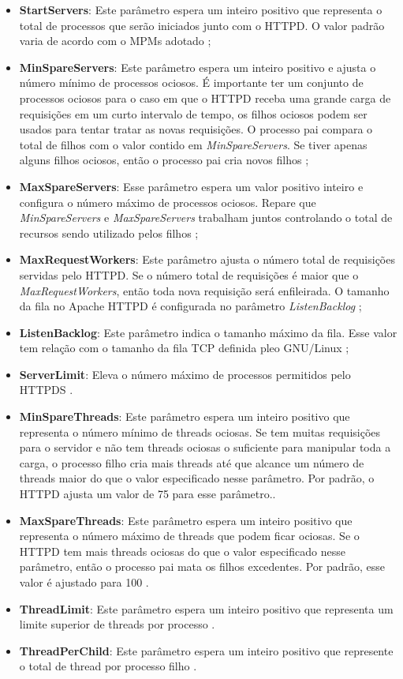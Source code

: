 \begin{itemize} \item \textbf{StartServers}: Este parâmetro espera um inteiro
positivo que representa o total de processos que serão iniciados junto com o
HTTPD.  O valor padrão varia de acordo com o MPMs adotado
\cite{mpm_start_server}; \item \textbf{MinSpareServers}: Este parâmetro espera
um inteiro positivo e ajusta o número mínimo de processos ociosos. É importante
ter um conjunto de processos ociosos para o caso em que o HTTPD receba uma
grande carga de requisições em um curto intervalo de tempo, os filhos ociosos
podem ser usados para tentar tratar as novas requisições. O processo pai
compara o total de filhos com o valor contido em \textit{MinSpareServers}. Se
tiver apenas alguns filhos ociosos, então o processo pai cria novos filhos
\cite{mpm_min_spare}; \item \textbf{MaxSpareServers}: Esse parâmetro espera um
valor positivo inteiro e configura o número máximo de processos ociosos. Repare
que \textit{MinSpareServers} e \textit{MaxSpareServers} trabalham juntos
controlando o total de recursos sendo utilizado pelos filhos
\cite{mpm_max_spare}; \item \textbf{MaxRequestWorkers}: Este parâmetro ajusta o
número total de requisições servidas pelo HTTPD. Se o número total de
requisições é maior que o \textit{MaxRequestWorkers}, então toda nova
requisição será enfileirada. O tamanho da fila no Apache HTTPD é configurada no
parâmetro \textit{ListenBacklog} \cite{mpm_max_request}; \item
\textbf{ListenBacklog}: Este parâmetro indica o tamanho máximo da fila.  Esse
valor tem relação com o tamanho da fila TCP definida pleo GNU/Linux
\cite{mpm_listen}; \item \textbf{ServerLimit}: Eleva o número máximo de
processos permitidos pelo HTTPDS \cite{mpm_server_limit}.  \item
\textbf{MinSpareThreads}: Este parâmetro espera um inteiro positivo que
representa o número mínimo de threads ociosas. Se tem muitas requisições para o
servidor e não tem threads ociosas o suficiente para manipular toda a carga, o
processo filho cria mais threads até que alcance um número de threads maior do
que o valor especificado nesse parâmetro.  Por padrão, o HTTPD ajusta um valor
de 75 para esse parâmetro.\cite{mpm_minsparethreads}.  \item
\textbf{MaxSpareThreads}: Este parâmetro espera um inteiro positivo que
representa o número máximo de threads que podem ficar ociosas. Se o HTTPD tem
mais threads ociosas do que o valor especificado nesse parâmetro, então o
processo pai mata os filhos excedentes. Por padrão, esse valor é ajustado para
100 \cite{mpm_maxsparethreads}.  \item \textbf{ThreadLimit}: Este parâmetro
espera um inteiro positivo que representa um limite superior de threads por
processo \cite{mpm_threadlimits}.  \item \textbf{ThreadPerChild}: Este
parâmetro espera um inteiro positivo que represente o total de thread por
processo filho \cite{mpm_threadperchild}.  \end{itemize}


